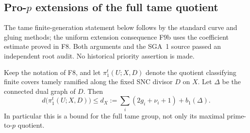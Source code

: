 \subsection{Pro-$p$ extensions of the full tame quotient}

The tame finite-generation statement below follows by the standard
curve and gluing methods; the uniform extension consequence F9b
uses the coefficient estimate proved in F8. Both arguments and the
SGA~1 source passed an independent root audit. No historical
priority assertion is made.

\begin{lemma}
Keep the notation of F8, and let $\pi_1^t(U;X,D)$ denote the quotient
classifying finite covers tamely ramified along the fixed SNC divisor
$D$ on $X$. Let $\Delta$ be the connected dual graph of $D$. Then
\[
 d\bigl(\pi_1^t(U;X,D)\bigr)
 \leq d_X:=\sum_i(2g_i+\nu_i+1)+b_1(\Delta).
 \tag{F9.1}
\]
In particular this is a bound for the full tame group, not only its
maximal prime-to-$p$ quotient.
\end{lemma}
